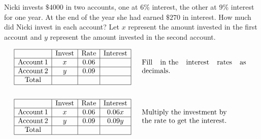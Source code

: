 \begin{example}
  Nicki invests $\$4000$ in two accounts, one at 6\% interest, the other at 9\% interest for one year. At the end of the year she had earned $\$270$ in interest. How much did Nicki invest in each account?\pp
	Let $x$ represent the amount invested in the first account and $y$ represent the amount invested in the second account.
	
	
  \begin{eqnarray*}
    \begin{array}{|c|c|c|c|}
      \hline
      & \tmop{Invest} & \tmop{Rate} & \tmop{Interest}\\
      \hline
      \tmop{Account} 1 & x & 0.06 & \\
      \hline
      \tmop{Account} 2 & y & 0.09 & \\
      \hline
      \tmop{Total} &  &  & \\
      \hline
    \end{array} &  & \begin{array}{p{0.425\textwidth}}
      \tmop{Fill} \tmop{in~the} \tmop{interest} \tmop{rates} \tmop{as}
      \tmop{decimals}.
    \end{array}\\
    &  & \\
    \begin{array}{|c|c|c|c|}
      \hline
      & \tmop{Invest} & \tmop{Rate} & \tmop{Interest}\\
      \hline
      \tmop{Account} 1 & x & 0.06 & 0.06 x\\
      \hline
      \tmop{Account} 2 & y & 0.09 & 0.09 y\\
      \hline
      \tmop{Total} &  &  & \\
      \hline
    \end{array} &  & \begin{array}{p{0.425\textwidth}}
		\text{Multiply~the~investment~by} \text{the~rate} \text{to~get} \text{the~interest}.%
		\end{array}\\
		&  & \\
    \begin{array}{|c|c|c|c|}
      \hline

\end{array}
\end{eqnarray*}
\end{example}
